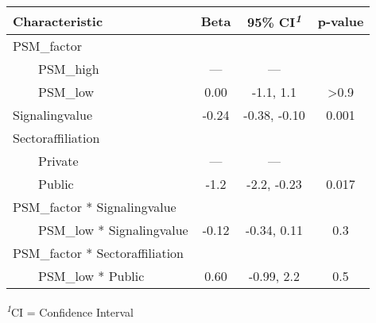 \setlength{\LTpost}{0mm}
\begin{longtable}{lccc}
\toprule
\textbf{Characteristic} & \textbf{Beta} & \textbf{95\% CI}\textsuperscript{\textit{1}} & \textbf{p-value} \\ 
\midrule\addlinespace[2.5pt]
PSM\_factor &  &  &  \\ 
    PSM\_high & — & — &  \\ 
    PSM\_low & 0.00 & -1.1, 1.1 & >0.9 \\ 
Signalingvalue & -0.24 & -0.38, -0.10 & 0.001 \\ 
Sectoraffiliation &  &  &  \\ 
    Private & — & — &  \\ 
    Public & -1.2 & -2.2, -0.23 & 0.017 \\ 
PSM\_factor * Signalingvalue &  &  &  \\ 
    PSM\_low * Signalingvalue & -0.12 & -0.34, 0.11 & 0.3 \\ 
PSM\_factor * Sectoraffiliation &  &  &  \\ 
    PSM\_low * Public & 0.60 & -0.99, 2.2 & 0.5 \\ 
\bottomrule
\end{longtable}
\begin{minipage}{\linewidth}
\textsuperscript{\textit{1}}CI = Confidence Interval\\
\end{minipage}

